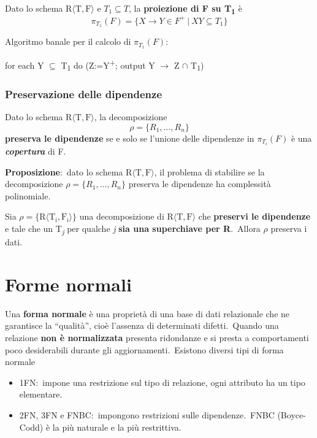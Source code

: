 \begin{definition}
	Dato lo schema $\mathrm{R\langle T,F \rangle}$ e $T_1 \subseteq T$, la \textbf{proiezione di F su T\textsubscript{1}} è
	\[ \pi_{T_1}(F) = \{X \rightarrow Y \in F^+\ |\ XY \subseteq T_1 \} \]
\end{definition}

\noindent Algoritmo banale per il calcolo di $\pi_{T_1}(F)$:

\begin{center}
	for each Y $\subseteq$ T\textsubscript{1} do (Z:=Y\textsuperscript{+}; output Y $\rightarrow$ Z $\cap$ T\textsubscript{1})
\end{center}

\subsubsection{Preservazione delle dipendenze}

\begin{definition}
	Dato lo schema $\mathrm{R\langle T,F \rangle}$, la decomposizione \[\rho = \{R_1, \dots, R_n\}\] \textbf{preserva le dipendenze} se e solo se l'unione delle dipendenze in $\pi_{T_i}(F)$ è una \textbf{\textit{copertura}} di F.
\end{definition}

\noindent \textbf{Proposizione}:\ dato lo schema $\mathrm{R\langle T,F \rangle}$, il problema di stabilire se la decomposizione $\rho = \{R_1,\dots,R_n\}$ preserva le dipendenze ha complessità polinomiale.

\begin{theorem}
	Sia $\rho= \{\mathrm{R\langle T_i,F_i \rangle}\}$ una decomposizione di $\mathrm{R\langle T,F \rangle}$ che \textbf{preservi le dipendenze} e tale che un T\textsubscript{\textit{j}} per qualche \textit{j} \textbf{sia una superchiave per R}.\
	Allora $\rho$ preserva i dati.
\end{theorem}

\section{Forme normali}

Una \textbf{forma normale} è una proprietà di una base di dati relazionale che ne garantisce la ``qualità'', cioè l'assenza di determinati difetti.\
Quando una relazione \textbf{non è normalizzata} presenta ridondanze e si presta a comportamenti poco desiderabili durante gli aggiornamenti.\
Esistono diversi tipi di forma normale
\begin{itemize}
	\item 1FN:\ impone una restrizione sul tipo di relazione, ogni attributo ha un tipo elementare.
	\item 2FN, 3FN e FNBC:\ impongono restrizioni sulle dipendenze.\ FNBC (Boyce-Codd) è la più naturale e la più restrittiva.
\end{itemize}

